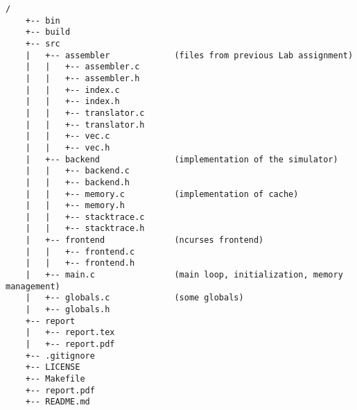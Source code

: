 \documentclass[12pt]{article}
\begin{document}
	\begin{verbatim}/
	+-- bin
	+-- build
	+-- src
	|   +-- assembler             (files from previous Lab assignment)
	|   |   +-- assembler.c
	|   |   +-- assembler.h
	|   |   +-- index.c
	|   |   +-- index.h
	|   |   +-- translator.c
	|   |   +-- translator.h
	|   |   +-- vec.c
	|   |   +-- vec.h
	|   +-- backend               (implementation of the simulator)
	|   |   +-- backend.c
	|   |   +-- backend.h
	|   |   +-- memory.c          (implementation of cache)
	|   |   +-- memory.h
	|   |   +-- stacktrace.c
	|   |   +-- stacktrace.h
	|   +-- frontend              (ncurses frontend)
	|   |   +-- frontend.c
	|   |   +-- frontend.h
	|   +-- main.c                (main loop, initialization, memory management)
	|   +-- globals.c             (some globals)
	|   +-- globals.h
	+-- report
	|   +-- report.tex
	|   +-- report.pdf
	+-- .gitignore
	+-- LICENSE
	+-- Makefile
	+-- report.pdf
	+-- README.md\end{verbatim}
\end{document}
